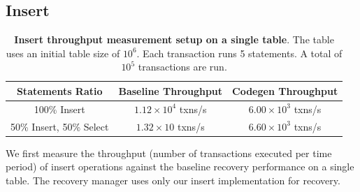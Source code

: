 \documentclass[12pt]{cmuthesis}
\begin{document}
\subsection{Insert}
\begin{table}[H]
\begin{center}
\begin{tabular}{ |c|c|c| } 
 \hline
Statements Ratio & \textbf{Baseline Throughput} & \textbf{Codegen Throughput}\\ 
 \hline
 100\% Insert & $1.12 \times 10^4$ txns/s & $6.00 \times 10^3$ txns/s\\
 \hline
 50\% Insert, 50\% Select & $1.32 \times 10$ txns/s & $6.60 \times 10^3$ txns/s \\ 
 \hline
\end{tabular}
\caption{\textbf{Insert throughput measurement setup on a single table}. The table uses an initial table size of $10^6$. Each transaction runs 5 statements. A total of $10^5$ transactions are run.}
\label{tab:throughput_exp_insert}
\end{center}
\end{table}
We first measure the throughput (number of transactions executed per time period) of insert operations against the baseline recovery performance on a single table. The recovery manager uses only our insert implementation for recovery.
\end{document}
